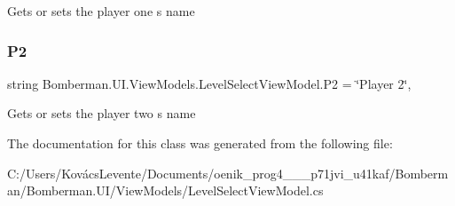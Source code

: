 Gets or sets the player one s name 

\mbox{\label{class_bomberman_1_1_u_i_1_1_view_models_1_1_level_select_view_model_a49af0fc46e0b68c371385ff0f998ed45}} 
\subsubsection{\texorpdfstring{P2}{P2}}
{\footnotesize\ttfamily string Bomberman.\+U\+I.\+View\+Models.\+Level\+Select\+View\+Model.\+P2 = \char`\"{}Player 2\char`\"{}\hspace{0.3cm}{\ttfamily [get]}, {\ttfamily [set]}}



Gets or sets the player two s name 



The documentation for this class was generated from the following file\+:\begin{DoxyCompactItemize}
\item 
C\+:/\+Users/\+Kovács\+Levente/\+Documents/oenik\+\_\+prog4\+\_\+\_\+\_\+p71jvi\+\_\+u41kaf/\+Bomberman/\+Bomberman.\+U\+I/\+View\+Models/Level\+Select\+View\+Model.\+cs\end{DoxyCompactItemize}

